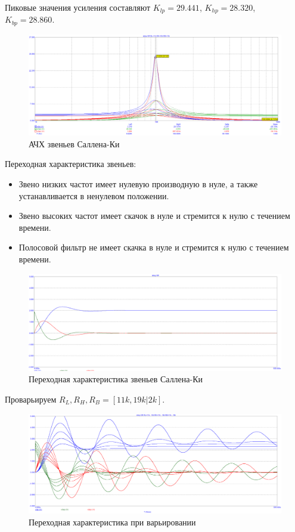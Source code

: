 \documentclass[12pt,a4paper]{article}
\begin{document}
	Пиковые значения усиления составляют $K_{lp} = 29.441$, $K_{hp} = 28.320$, $K_{bp} = 28.860$.
	\begin{figure}[H]
		\centering
		\includegraphics[width=1.0\linewidth]{res/skey_11_19_scoped.png}
		\caption{АЧХ звеньев Саллена-Ки}
		\label{scheme}
	\end{figure}
	
	Переходная характеристика звеньев:
	\begin{itemize}
		\item Звено низких частот имеет нулевую производную в нуле, а также устанавливается в ненулевом положении.
		\item Звено высоких частот имеет скачок в нуле и стремится к нулю с течением времени.
		\item Полосовой фильтр не имеет скачка в нуле и стремится к нулю с течением времени.
	\end{itemize}

	\begin{figure}[H]
		\centering
		\includegraphics[width=1.0\linewidth]{res/skey_transient.png}
		\caption{Переходная характеристика звеньев Саллена-Ки}
		\label{scheme}
	\end{figure}
	Проварьируем $R_L, R_H, R_B = [11k, 19k | 2k]$.
	\begin{figure}[H]
		\centering
		\includegraphics[width=1.0\linewidth]{res/skey_transient_11_19.png}
		\caption{Переходная характеристика при варьировании}
		\label{scheme}
	\end{figure}
	
\end{document}
